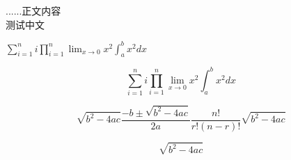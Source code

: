 \documentclass[a4paper,12pt]{article}
\begin{document}
\begin{CJK*}{UTF8}{gkai}%

......正文内容\\
测试中文
\end{CJK*}

$\sum_{i=1}^n i \prod_{i=1}^n \lim_{x\to0}x^2 \int_a^b x^2 dx$

\[\sum_{i=1}^n i \prod_{i=1}^n \lim_{x\to0}x^2 \int_a^b x^2 dx\]

\[\sqrt {{b^2} - 4ac} \frac{{ - b \pm \sqrt {{b^2} - 4ac} }}{{2a}}\frac{{n!}}{{r!\left( {n - r} \right)!}}\sqrt {{b^2} - 4ac} \]

\[\sqrt {{b^2} - 4ac} \]
\end{document}
